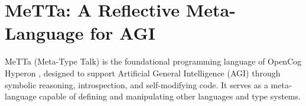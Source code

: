 \documentclass{article}
\begin{document}
% 
% 
% 
% 
% 
% 
% 

\section{MeTTa: A Reflective Meta-Language for AGI}

MeTTa (Meta-Type Talk) \cite{goertzel2021metagraph} \cite{singularitynet2024mett} is the foundational programming language of OpenCog Hyperon \cite{opencogHyperon}, designed to support Artificial General Intelligence (AGI) through symbolic reasoning, introspection, and self-modifying code. It serves as a meta-language capable of defining and manipulating other languages and type systems.
\end{document}
